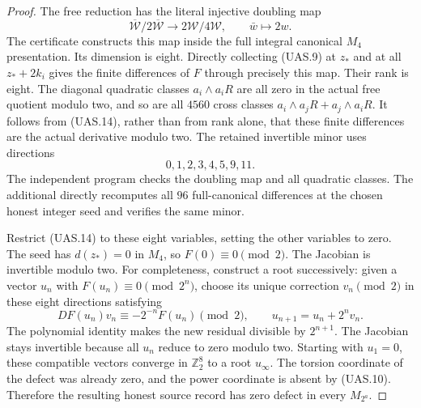 \begin{proof}
The free reduction has the literal injective doubling map
\[
 \overline{\mathcal W}/2\overline{\mathcal W}
           \longrightarrow 2\mathcal W/4\mathcal W,
           \qquad \bar w\longmapsto2w.                           \tag{UAS.15}
\]
The certificate constructs this map inside the full integral
canonical $M_4$ presentation.  Its dimension is eight.  Directly
collecting (UAS.9) at $z_*$ and at all $z_*+2k_i$ gives the
finite differences of $F$ through precisely this map.
Their rank is eight.  The diagonal quadratic classes
$a_i\wedge a_iR$ are all zero in the actual free quotient modulo
two, and so are all $4560$ cross classes
$a_i\wedge a_jR+a_j\wedge a_iR$.
It follows from (UAS.14), rather than from rank alone, that these
finite differences are the actual derivative modulo two.
The retained invertible minor uses directions
\[
                         0,1,2,3,4,5,9,11.                       \tag{UAS.16}
\]
The independent program 
checks the doubling map and all quadratic classes.
The additional  directly
recomputes all $96$ full-canonical differences at the chosen
honest integer seed and verifies the same minor.

Restrict (UAS.14) to these eight variables, setting the other
variables to zero.  The seed has $d(z_*)=0$ in $M_4$, so
$F(0)\equiv0\pmod2$.  The Jacobian is invertible modulo two.
For completeness, construct a root successively: given a vector
$u_n$ with $F(u_n)\equiv0\pmod{2^n}$, choose its unique correction
$v_n\pmod2$ in these eight directions satisfying
\[
       DF(u_n)v_n\equiv-2^{-n}F(u_n)\pmod2,
       \qquad u_{n+1}=u_n+2^n v_n.                               \tag{UAS.17}
\]
The polynomial identity makes the new residual divisible by
$2^{n+1}$.  The Jacobian stays invertible because all $u_n$ reduce
to zero modulo two.  Starting with $u_1=0$, these compatible
vectors converge in $\mathbb Z_2^8$ to a root $u_\infty$.
The torsion coordinate of the defect was already zero, and the
power coordinate is absent by (UAS.10).  Therefore the resulting
honest source record has zero defect in every $M_{2^a}$.


\end{proof}
